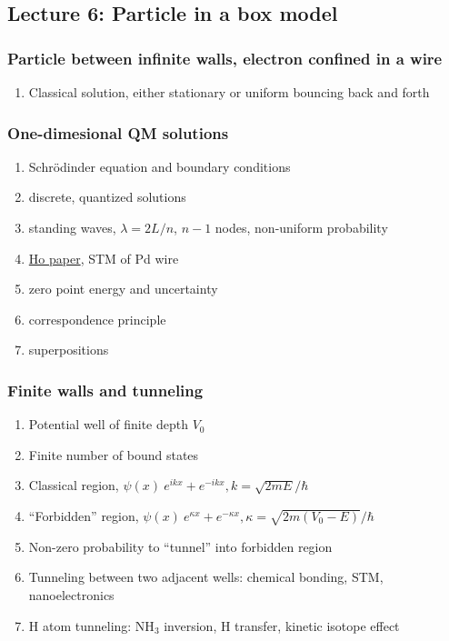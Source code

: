 \documentclass[11pt]{article}
\begin{document}
\subsection{Lecture 6: Particle in a box model}
\label{sec:org4b31b66}
\subsubsection{Particle between infinite walls, electron confined in a wire}
\label{sec:orgc5c7c09}
\begin{enumerate}
\item Classical solution, either stationary or uniform bouncing back and forth
\end{enumerate}
\subsubsection{One-dimesional QM solutions}
\label{sec:org3735c64}
\begin{enumerate}
\item Schr\"{o}dinder equation and boundary conditions
\item discrete, quantized solutions
\item standing waves, \(\lambda=2 L/n\), \(n-1\) nodes, non-uniform probability
\item \href{http://dx.doi.org/10.1021/jp053496l}{Ho paper}, STM of Pd wire
\item zero point energy and uncertainty
\item correspondence principle
\item superpositions
\end{enumerate}
\subsubsection{Finite walls and tunneling}
\label{sec:org6667615}
\begin{enumerate}
\item Potential well of finite depth \(V_0\)
\item Finite number of bound states
\item Classical region, \(\psi(x) ~ e^{ikx}+e^{-ikx}, k=\sqrt{2mE}/\hbar\)
\item ``Forbidden'' region, \(\psi(x) ~ e^{\kappa x}+e^{-\kappa x},
      \kappa=\sqrt{2m(V_0-E)}/\hbar\)
\item Non-zero probability to ``tunnel'' into forbidden region
\item Tunneling between two adjacent wells: chemical bonding, STM, nanoelectronics
\item H atom tunneling: NH\(_3\) inversion, H transfer, kinetic isotope effect
\end{enumerate}
\end{document}
